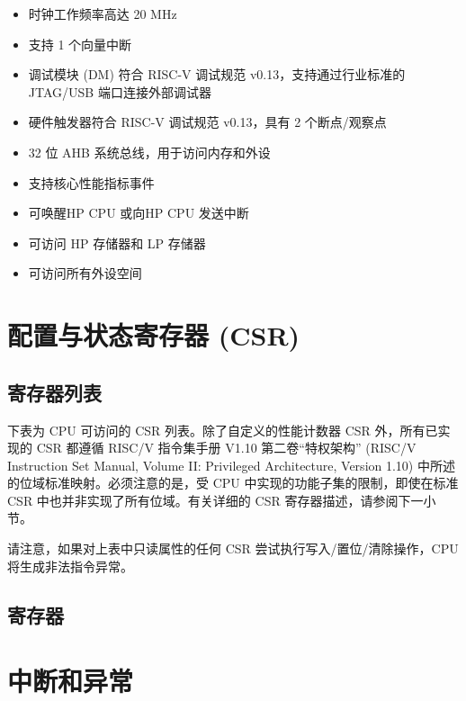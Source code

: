 \documentclass[main\_\_CN.tex]{subfiles}
\begin{document}
\begin{itemize}
    \item 时钟工作频率高达 20 MHz
    \item 支持 1 个向量中断
    \item 调试模块 (DM) 符合 RISC-V 调试规范 v0.13，支持通过行业标准的 JTAG/USB 端口连接外部调试器
    \item 硬件触发器符合 RISC-V 调试规范 v0.13，具有 2 个断点/观察点
    \item 32 位 AHB 系统总线，用于访问内存和外设
    \item 支持核心性能指标事件
    \item 可唤醒HP CPU 或向HP CPU 发送中断
    \item 可访问 HP 存储器和 LP 存储器
    \item 可访问所有外设空间

\end{itemize}

\section{配置与状态寄存器 (CSR)}
\hypertarget{ulp-reg-summ}{}
\subsection{寄存器列表}
\label{sec:ulp-reg-summ}


下表为 CPU 可访问的 CSR 列表。除了自定义的性能计数器 CSR 外，所有已实现的 CSR 都遵循 RISC\-/V 指令集手册 V1.10 第二卷“特权架构” (RISC\-/V Instruction Set Manual, Volume II: Privileged Architecture, Version 1.10) 中所述的位域标准映射。必须注意的是，受 CPU 中实现的功能子集的限制，即使在标准 CSR 中也并非实现了所有位域。有关详细的 CSR 寄存器描述，请参阅下一小节。



请注意，如果对上表中只读属性的任何 CSR 尝试执行写入/置位/清除操作，CPU 将生成非法指令异常。

\subsection{寄存器}




\section{中断和异常}
\end{document}
